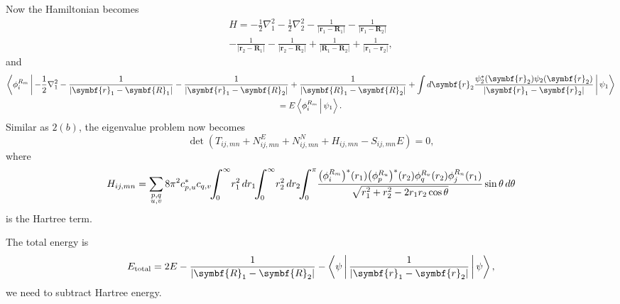 Now the Hamiltonian becomes
%
\begin{multline}
    H = -\frac{1}{2}\nabla_1^2 - \frac{1}{2}\nabla_2^2
    - \frac{1}{\lvert \symbf{r}_1 - \symbf{R}_1 \rvert} - \frac{1}{\lvert \symbf{r}_1 - \symbf{R}_2 \rvert}\\
    - \frac{1}{\lvert \symbf{r}_2 - \symbf{R}_1 \rvert} - \frac{1}{\lvert \symbf{r}_2 - \symbf{R}_2 \rvert}
    + \frac{1}{\lvert \symbf{R}_1 - \symbf{R}_2 \rvert} + \frac{1}{\lvert \symbf{r}_1 - \symbf{r}_2 \rvert},
\end{multline}
%
and
%
\begin{multline}
    \Braket{\phi_i^{R_m} |
        - \frac{1}{2}\nabla_1^2 - \frac{1}{\lvert \symbf{r}_1 - \symbf{R}_1 \rvert}
        - \frac{1}{\lvert \symbf{r}_1 - \symbf{R}_2 \rvert}
        + \frac{1}{\lvert \symbf{R}_1 - \symbf{R}_2 \rvert}
        + \int d\symbf{r}_2 \frac{\psi_2^\ast (\symbf{r}_2) \psi_2(\symbf{r}_2)}{\lvert \symbf{r}_1 - \symbf{r}_2 \rvert}
        | \psi_1}\\
    = E \Braket{\phi_i^{R_m} | \psi_1}.
\end{multline}
%
Similar as $2(b)$, the eigenvalue problem now becomes
%
\begin{equation}
    \det(T_{ij, mn} + N^E_{ij, mn} + N^N_{ij, mn} + H_{ij, mn} - S_{ij, mn} E) = 0,
\end{equation}
%
where
%
\begin{multline}
    H_{ij, mn} = \sum_{\substack{p, q\\u, v}} 8\pi^2 c_{p, u}^\ast c_{q, v}
    \! \scaleint{7ex}_{\bs 0}^{\infty} r_1^2 \, dr_1
    \! \scaleint{7ex}_{\bs 0}^{\infty} r_2^2 \, dr_2
    \! \scaleint{7ex}_{\bs 0}^{\pi}
    \frac{\bigl( \phi_i^{R_m} \bigr)^\ast(r_1) \bigl(\phi_p^{R_u} \bigr)^\ast(r_2)%
        \phi_q^{R_v}(r_2)\phi_j^{R_n}(r_1)}{\sqrt{r_1^2 + r_2^2 - 2 r_1 r_2 \cos\theta}}
    \sin\theta\, d\theta
\end{multline}
%
is the Hartree term.

The total energy is
%
\begin{equation}
    E_{\text{total}} = 2 E - \frac{1}{\lvert \symbf{R}_1 - \symbf{R}_2 \rvert} -
    \Braket{\psi | \frac{1}{\lvert \symbf{r}_1 - \symbf{r}_2 \rvert} | \psi},
\end{equation}
%
we need to subtract Hartree energy.


